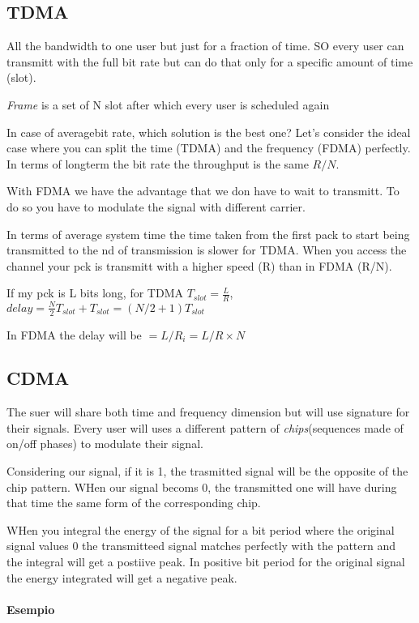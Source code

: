 \subsection{TDMA}
All the bandwidth to one user but just for a fraction of time. 
SO every user can transmitt with the full bit rate but can do that only for a specific amount of time (slot). 
 
 
\emph{Frame} is a set of N slot after which every user is scheduled again

In case of averagebit rate, which solution is the best one? 
Let's consider the ideal case where you can split the time (TDMA) and the frequency (FDMA) perfectly. 
In terms of longterm the bit rate the throughput is the same $R/N$. 

With FDMA we have the advantage that we don have to wait to transmitt. To do so you have to modulate the signal with different carrier. 

In terms of average system time the time taken from the first pack to start being transmitted to the nd of transmission is slower for TDMA. When you access the channel your pck is transmitt with a higher speed (R) than in FDMA (R/N).

If my pck is L bits long, for TDMA $T_{slot} = \frac{L}{R}$, $delay = \frac{N}{2} T_{slot} + T_{slot} = (N/2 + 1)T_{slot}$

In FDMA the delay will be $= L/R_i = L/R\times N$

\subsection{CDMA}
The suer will share both time and frequency dimension but will use signature for their signals. Every user will uses a different pattern of \emph{chips}(sequences made of on/off phases) to modulate their signal. 

Considering our signal, if it is 1, the trasmitted signal will be the opposite of the chip pattern. WHen our signal becoms 0, the transmitted one will have during that time the same form of the corresponding chip. 

WHen you integral the energy of the signal for a bit period where the original signal values 0 the transmitteed signal matches perfectly with the pattern and the integral will get a postiive peak. In positive bit period for the original signal the energy integrated will get a negative peak. 

\paragraph{Esempio}

